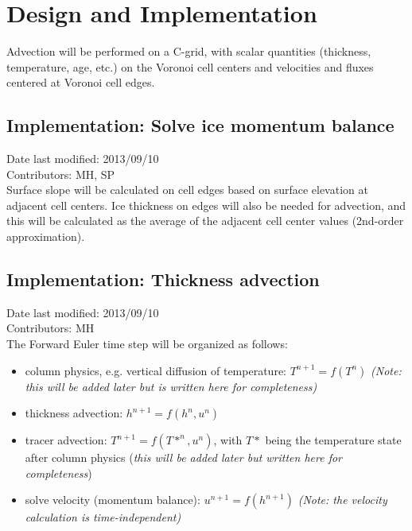 \documentclass[11pt]{report}
\begin{document}

\chapter{Design and Implementation}

Advection will be performed on a C-grid, with scalar quantities (thickness, temperature, age, etc.) on the Voronoi cell centers and velocities and fluxes centered at Voronoi cell edges.

\section{Implementation: Solve ice momentum balance}
Date last modified: 2013/09/10 \\
Contributors: MH, SP \\

Surface slope will be calculated on cell edges based on surface elevation at adjacent cell centers.  Ice thickness on edges will also be needed for advection, and this will be calculated as the average of the adjacent cell center values (2nd-order approximation).

\section{Implementation: Thickness advection}
Date last modified: 2013/09/10 \\
Contributors: MH \\

The Forward Euler time step will be organized as follows:

\begin{itemize}
\item column physics, e.g. vertical diffusion of temperature: $T^{n+1} = f(T^n)$  \emph{(Note: this will be added later but is written here for completeness)}
\item thickness advection: $h^{n+1} = f(h^n, u^n)$
\item tracer advection: $T^{n+1} = f(T*^n, u^n)$, with $T*$ being the temperature state after column physics  (\emph{this will be added later but written here for completeness})
\item solve velocity (momentum balance): $u^{n+1} = f(h^{n+1})$  \emph{(Note: the velocity calculation is time-independent)}
\end{itemize}
\end{document}
